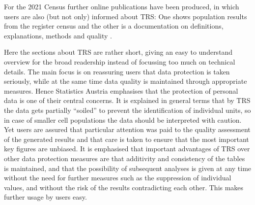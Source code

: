 For the 2021 Census further online publications have been produced, in which users are also (but not only) informed about TRS: One shows population results from the register census \cite{StatAT_Zensus} and the other is a documentation on definitions, explanations, methods and quality \cite{StatAT_Metainformationen}.

Here the sections about TRS are rather short, giving an easy to understand overview for the broad readership instead of focussing too much on technical details. The main focus is on reassuring users that data protection is taken seriously, while at the same time data quality is maintained through appropriate measures. Hence Statistics Austria emphasises that the protection of personal data is one of their central concerns. It is explained in general terms that by TRS the data gets partially “soiled” to prevent the identification of individual units, so in case of smaller cell populations the data should be interpreted with caution. Yet users are assured that particular attention was paid to the quality assessment of the generated results and that care is taken to ensure that the most important key figures are unbiased. It is emphasised that important advantages of TRS over other data protection measures are that additivity and consistency of the tables is maintained, and that the possibility of subsequent analyses is given at any time without the need for further measures such as the suppression of individual values, and without the risk of the results contradicting each other. This makes further usage by users easy.





